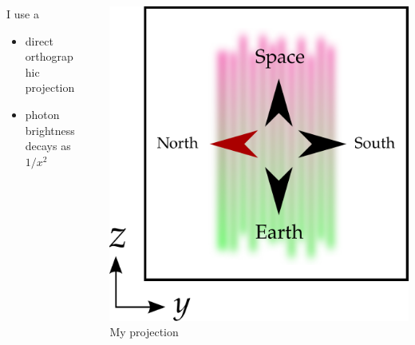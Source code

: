 \documentclass[xcolor=pdftex,dvipsnames,table,usenames,11pt]{beamer}
\begin{document}
\begin{frame}
\begin{columns}[onlytextwidth]
  \begin{column}{0.5\textwidth}
  I use a 
  \begin{itemize}
  \item direct orthographic projection
  \item photon brightness decays as $1/x^2$
  \end{itemize}
  \end{column}
  \begin{column}{0.05\textwidth}
  \end{column}
  \begin{column}{0.5\textwidth}
    \includegraphics[width=\textwidth]{img/projection.pdf}\\
	\hfill { \tiny My projection}
  \end{column}
\end{columns} 
\end{frame}
\end{document}
